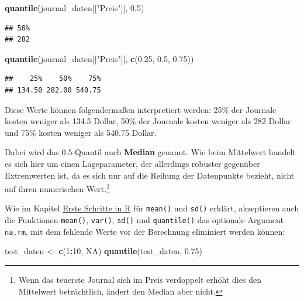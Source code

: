 \documentclass[]{book}
\newenvironment{Shaded}{\begin{snugshade}}{\end{snugshade}}
\newcommand{\KeywordTok}[1]{\textcolor[rgb]{0.13,0.29,0.53}{\textbf{#1}}}
\newcommand{\DecValTok}[1]{\textcolor[rgb]{0.00,0.00,0.81}{#1}}
\newcommand{\FloatTok}[1]{\textcolor[rgb]{0.00,0.00,0.81}{#1}}
\newcommand{\StringTok}[1]{\textcolor[rgb]{0.31,0.60,0.02}{#1}}
\newcommand{\OtherTok}[1]{\textcolor[rgb]{0.56,0.35,0.01}{#1}}
\newcommand{\OperatorTok}[1]{\textcolor[rgb]{0.81,0.36,0.00}{\textbf{#1}}}
\newcommand{\NormalTok}[1]{#1}
\let\rmarkdownfootnote\footnote%
\def\footnote{\protect\rmarkdownfootnote}
\begin{document}
\begin{Shaded}
\begin{Highlighting}[]
\KeywordTok{quantile}\NormalTok{(journal_daten[[}\StringTok{"Preis"}\NormalTok{]], }\FloatTok{0.5}\NormalTok{)}
\end{Highlighting}
\end{Shaded}

\begin{verbatim}
## 50% 
## 282
\end{verbatim}

\begin{Shaded}
\begin{Highlighting}[]
\KeywordTok{quantile}\NormalTok{(journal_daten[[}\StringTok{"Preis"}\NormalTok{]], }\KeywordTok{c}\NormalTok{(}\FloatTok{0.25}\NormalTok{, }\FloatTok{0.5}\NormalTok{, }\FloatTok{0.75}\NormalTok{))}
\end{Highlighting}
\end{Shaded}

\begin{verbatim}
##    25%    50%    75% 
## 134.50 282.00 540.75
\end{verbatim}

Diese Werte können folgendermaßen interpretiert werden: 25\% der
Journale kosten weniger als 134.5 Dollar, 50\% der Journale kosten
weniger als 282 Dollar und 75\% kosten weniger als 540.75 Dollar.

Dabei wird das \(0.5\)-Quantil auch \textbf{Median} genannt. Wie beim
Mittelwert handelt es sich hier um einen Lageparameter, der allerdings
robuster gegenüber Extremwerten ist, da es sich nur auf die Reihung der
Datenpunkte bezieht, nicht auf ihren numerischen Wert.\footnote{Wenn das
  teuerste Journal sich im Preis verdoppelt erhöht dies den Mittelwert
  beträchtlich, ändert den Median aber nicht.}

Wie im Kapitel \protect\hyperlink{basics}{Erste Schritte in R} für
\texttt{mean()} und \texttt{sd()} erklärt, akzeptieren auch die
Funktionen \texttt{mean()}, \texttt{var()}, \texttt{sd()} und
\texttt{quantile()} das optionale Argument \texttt{na.rm}, mit dem
fehlende Werte vor der Berechnung eliminiert werden können:

\begin{Shaded}
\begin{Highlighting}[]
\NormalTok{test_daten <-}\StringTok{ }\KeywordTok{c}\NormalTok{(}\DecValTok{1}\OperatorTok{:}\DecValTok{10}\NormalTok{, }\OtherTok{NA}\NormalTok{)}
\KeywordTok{quantile}\NormalTok{(test_daten, }\FloatTok{0.75}\NormalTok{)}
\end{Highlighting}
\end{Shaded}
\end{document}
